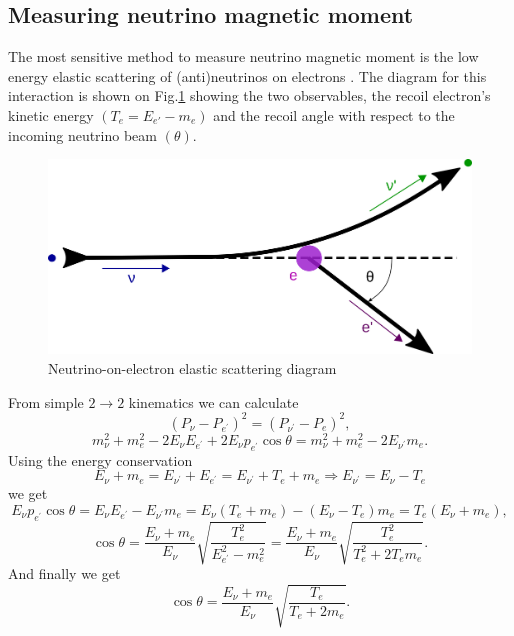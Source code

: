 \subsection{Measuring neutrino magnetic moment}\label{sec:MeasuringNuMM}
The most sensitive method to measure neutrino magnetic moment is the low energy elastic scattering of (anti)neutrinos on electrons \cite{nuElmagInt2015.pdf}. The diagram for this interaction is shown on Fig.\ref{fig:NuoneDiagram} showing the two observables, the recoil electron's kinetic energy $\left(T_e=E_{e\prime}-m_e\right)$ and the recoil angle with respect to the incoming neutrino beam $\left(\theta\right)$.
\begin{figure}[hbtp]
\centering
\includegraphics[width=0.55\linewidth]{Plots/NuMM/NuoneInteraction.png}
\caption{Neutrino-on-electron elastic scattering diagram}
\label{fig:NuoneDiagram}
\end{figure}

From simple $2\rightarrow 2$ kinematics we can calculate
\begin{equation}
\left(P_{\nu}-P_{e^{\prime}}\right)^2=\left(P_{\nu^{\prime}}-P_e\right)^2,
\end{equation}
\begin{equation}
m_{\nu}^2+m_e^2-2E_{\nu}E_{e^{\prime}}+2E_{\nu}p_{e^{\prime}}\cos\theta=m_{\nu}^2+m_e^2-2E_{\nu^{\prime}}m_e.
\end{equation}
Using the energy conservation
\begin{equation}
E_{\nu}+m_e=E_{\nu^{\prime}}+E_{e^{\prime}}=E_{\nu^{\prime}}+T_e+m_e\Rightarrow E_{\nu^{\prime}}=E_{\nu}-T_e
\end{equation}
we get
\begin{equation}
E_{\nu}p_{e^{\prime}}\cos\theta=E_{\nu}E_{e^{\prime}}-E_{\nu^{\prime}}m_e=E_{\nu}\left(T_e+m_e\right)-\left(E_{\nu}-T_e\right)m_e=T_e\left(E_{\nu}+m_e\right),
\end{equation}
\begin{equation}
\cos\theta=\frac{E_{\nu}+m_e}{E_{\nu}}\sqrt{\frac{T_e^2}{E_{e^{\prime}}^2-m_e^2}}=\frac{E_{\nu}+m_e}{E_{\nu}}\sqrt{\frac{T_e^2}{T_e^2+2T_em_e}}.
\end{equation}
And finally we get
\begin{equation}\label{eq:ThetaTRelation}
\cos\theta=\frac{E_{\nu}+m_e}{E_{\nu}}\sqrt{\frac{T_e}{T_e+2m_e}}.
\end{equation}

